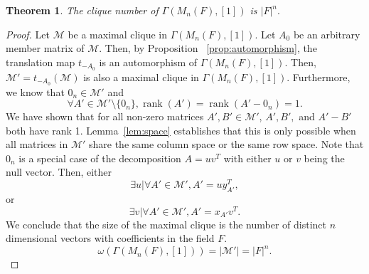 \documentclass[12pt, a4paper]{amsart}
\newtheorem{thm}{Theorem}[section]
\theoremstyle{definition}
\numberwithin{equation}{section}
\DeclareMathOperator{\rank}{rank}
\begin{document}
\begin{thm} \label{thm:clique}
    The clique number of $\Gamma(M_n(F), [1])$ is $|F|^n.$
\end{thm}
\begin{proof}
    Let $\mathcal{M}$ be a maximal clique in $\Gamma(M_n(F), [1])$. 
Let $A_0$ be an arbitrary member matrix of $\mathcal{M}$. Then, by Proposition ~\ref{prop:automorphism}, the translation map $t_{-A_0}$ is an automorphism of $\Gamma(M_n(F),[1]).$ Then, $\mathcal{M'} = t_{-A_0}(\mathcal{M})$ is also a maximal clique in $\Gamma(M_n(F), [1])$. Furthermore, we know that $0_n \in \mathcal{M'}$ and 
    \[\forall A' \in \mathcal{M'} \setminus \{0_n\}, \rank(A')=\rank(A'-0_n)=1.\]
    We have shown that for all non-zero matrices $A',B' \in \mathcal{M'}$, $A',B',$ and $A'-B'$ both have rank 1. Lemma~\ref{lem:space} establishes that this is only possible when all matrices in $\mathcal{M'}$ share the same column space or the same row space. Note that $0_n$ is a special case of the decomposition $A=uv^T$ with either $u$ or $v$ being the null vector. Then, either
    \[\exists u | \forall A' \in \mathcal{M'}, A' = u y_{A'}^T,\]
    or
    \[\exists v | \forall A' \in \mathcal{M'}, A' = x_{A'} v^T.\]
 We conclude that  the size of the maximal clique is the number of distinct $n$ dimensional vectors with coefficients in the field $F$.
    \[\omega(\Gamma(M_n(F), [1])) = |\mathcal{M'}| = |F|^n.\]
\end{proof}
\end{document}
